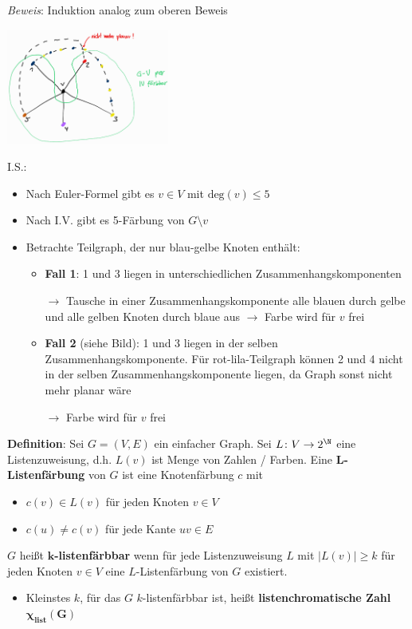 \textit{Beweis}: Induktion analog zum oberen Beweis
\begin{center}
	\includegraphics[width=0.4\textwidth]{images/5-f.png}
\end{center}

I.S.:
\begin{itemize}
	\item Nach Euler-Formel gibt es $v\in V$ mit $\text{deg}(v)\leq 5$
	\item Nach I.V. gibt es 5-Färbung von $G\setminus v$
	\item Betrachte Teilgraph, der nur blau-gelbe Knoten enthält:
	\begin{itemize}
		\item \textbf{Fall 1}: 1 und 3 liegen in unterschiedlichen Zusammenhangskomponenten
		
		$\rightarrow$ Tausche in einer Zusammenhangskomponente alle blauen durch gelbe und alle gelben Knoten durch blaue aus $\rightarrow$ Farbe wird für $v$ frei
		\item \textbf{Fall 2} (siehe Bild): 1 und 3 liegen in der selben Zusammenhangskomponente. Für rot-lila-Teilgraph können 2 und 4 nicht in der selben Zusammenhangskomponente liegen, da Graph sonst nicht mehr planar wäre
		
		$\rightarrow$ Farbe wird für $v$ frei
	\end{itemize}
\end{itemize}
\bigskip
\textbf{Definition}: Sei $G=(V,E)$ ein einfacher Graph. Sei $L\colon V\rightarrow 2^\N$ eine Listenzuweisung, d.h. $L(v)$ ist Menge von Zahlen / Farben. Eine \textbf{$\boldsymbol{L}$-Listenfärbung} von $G$ ist eine Knotenfärbung $c$ mit
\begin{itemize}
	\item $c(v)\in L(v)$ für jeden Knoten $v\in V$
	\item $c(u)\neq c(v)$ für jede Kante $uv\in E$
\end{itemize}
$G$ heißt \textbf{$\boldsymbol{k}$-listenfärbbar} wenn für jede Listenzuweisung $L$ mit $|L(v)|\geq k$ für jeden Knoten $v\in V$ eine $L$-Listenfärbung von $G$ existiert.
\begin{itemize}
	\item Kleinstes $k$, für das $G$ $k$-listenfärbbar ist, heißt \textbf{listenchromatische Zahl $\boldsymbol{\chi_{\text{list}}(G)}$}
\end{itemize}
